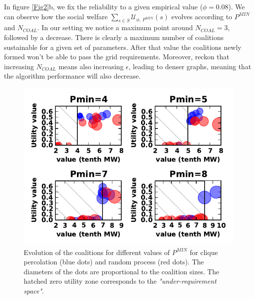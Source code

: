 \documentclass[conference]{IEEEtran}
\begin{document}
In figure \ref{Fig2}b, we fix the reliability to a given empirical value ($\phi = 0.08 $). We can observe how the social welfare $\sum_{s \in S} \mathcal{U}_{\phi,\ P^{MIN}}(s)$ evolves according to $P^{MIN}$ and $ N_{COAL} $. In our setting we notice a maximum point around $ N_{COAL} = 3 $, followed by a decrease. There is clearly a maximum number of coalitions sustainable for a given set of parameters. After that value the coalitions newly formed won't be able to pass the grid requirements. Moreover, reckon that increasing $ N_{COAL} $ means also increasing $ \epsilon $, leading to denser graphs, meaning that the algorithm performance will also decrease.

\begin{figure}[htbp]
  \centering
  \includegraphics[scale=0.9]{./figure5/coals}
  \caption{Evolution of the coalitions for different values of $ P^{MIN} $ for clique percolation (blue dots) and random process (red dots). The diameters of the dots are proportional to the coalition sizes. The hatched zero utility zone corresponds to the \textit{"under-requirement space"}.}
  \label{Fig3}
\end{figure}
\end{document}
